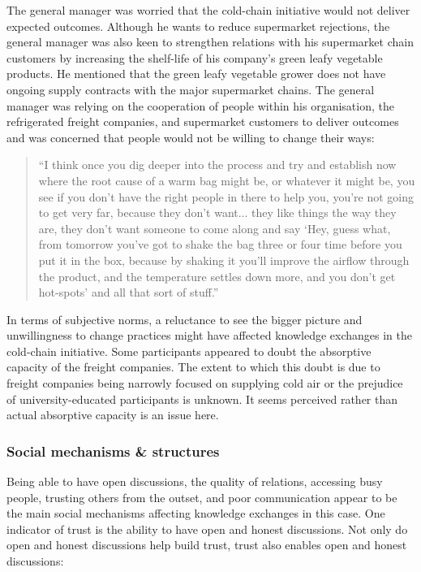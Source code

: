 The general manager was worried that the cold-chain initiative would not deliver expected outcomes. Although he wants to reduce supermarket rejections, the general manager was also keen to strengthen relations with his supermarket chain customers by increasing the shelf-life of his company's green leafy vegetable products. He mentioned that the green leafy vegetable grower does not have ongoing supply contracts with the major supermarket chains. The general manager was relying on the cooperation of people within his organisation, the refrigerated freight companies, and supermarket customers to deliver outcomes and was concerned that people would not be willing to change their ways:

\begin{quote}
\small
\enquote{I think once you dig deeper into the process and try and establish now where the root cause of a warm bag might be, or whatever it might be, you see if you don't have the right people in there to help you, you’re not going to get very far, because they don't want... they like things the way they are, they don't want someone to come along and say \enquote{Hey, guess what, from tomorrow you've got to shake the bag three or four time before you put it in the box, because by shaking it you'll improve the airflow through the product, and the temperature settles down more, and you don't get hot-spots} and all that sort of stuff.} \\
\end{quote}

In terms of subjective norms, a reluctance to see the bigger picture and unwillingness to change practices might have affected knowledge exchanges in the cold-chain initiative. Some participants appeared to doubt the absorptive capacity of the freight companies. The extent to which this doubt is due to freight companies being narrowly focused on supplying cold air or the prejudice of university-educated participants is unknown. It seems perceived rather than actual absorptive capacity is an issue here.

\subsubsection{Social mechanisms \& structures}

Being able to have open discussions, the quality of relations, accessing busy people, trusting others from the outset, and poor communication appear to be the main social mechanisms affecting knowledge exchanges in this case. One indicator of trust is the ability to have open and honest discussions. Not only do open and honest discussions help build trust, trust also enables open and honest discussions:

